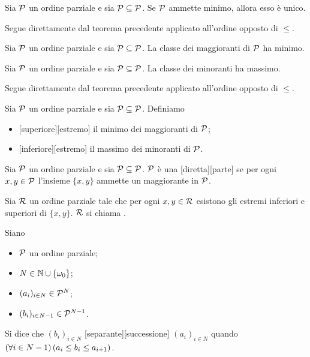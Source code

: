 \begin{Corollary}
	Sia $\mathcal{P}$ un ordine parziale e sia $\mathcal{P} \subseteq \mathcal{P}$. Se $\mathcal{P}$ ammette minimo, allora esso \`e unico.
\end{Corollary}
\Proof Segue direttamente dal teorema precedente applicato all'ordine opposto di $\leq$. \EndProof
\begin{Theorem}
	Sia $\mathcal{P}$ un ordine parziale e sia $\mathcal{P} \subseteq \mathcal{P}$. La classe dei maggioranti di $\mathcal{P}$ ha minimo.
\end{Theorem}
\Proof
\begin{Corollary}
	Sia $\mathcal{P}$ un ordine parziale e sia $\mathcal{P} \subseteq \mathcal{P}$. La classe dei minoranti ha massimo.
\end{Corollary}
\Proof Segue direttamente dal teorema precedente applicato all'ordine opposto di $\leq$. \EndProof
\begin{Definition}
	Sia $\mathcal{P}$ un ordine parziale e sia $\mathcal{P} \subseteq \mathcal{P}$. Definiamo
	\begin{itemize}
		\item {}[superiore][estremo] il minimo dei maggioranti di $\mathcal{P}$;
		\item {}[inferiore][estremo] il massimo dei minoranti di $\mathcal{P}$.
	\end{itemize}
\end{Definition}
\begin{Definition}
	Sia $\mathcal{P}$ un ordine parziale e sia $\mathcal{P} \subseteq \mathcal{P}$. $\mathcal{P}$ \`e una [diretta][parte] se per ogni $x, y \in \mathcal{P}$ l'insieme $\lbrace x, y \rbrace$ ammette un maggiorante in $\mathcal{P}$.
\end{Definition}
\begin{Definition}
	Sia $\mathcal{R}$ un ordine parziale tale che per ogni $x, y \in \mathcal{R}$ esistono gli estremi inferiori e superiori di $\lbrace x, y \rbrace$. $\mathcal{R}$ si chiama .
\end{Definition}
\begin{Definition}
	Siano
	\begin{itemize}
		\item $\mathcal{P}$ un ordine parziale;
		\item $N \in \mathbb{N} \cup \lbrace \omega_0 \rbrace$;
		\item $(a_i)_{i \in N} \in \mathcal{P}^N$;
		\item $(b_i)_{i \in N - 1} \in \mathcal{P}^{N - 1}$.
	\end{itemize}
	Si dice che $(b_i)_{i \in N}$ [separante][successione] $(a_i)_{i \in N}$ quando $\left ( \forall i \in N - 1 \right ) \left ( a_i \leq b_i \leq a_{i + 1} \right )$.
\end{Definition}
